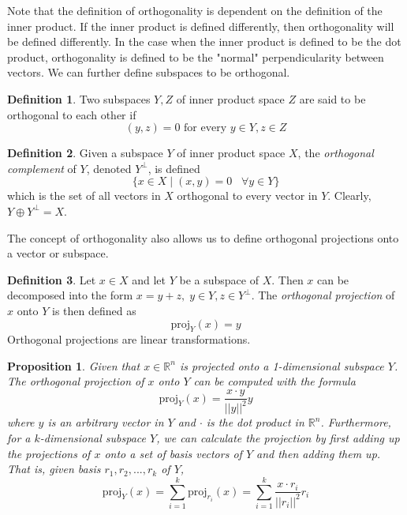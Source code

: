 \documentclass{article}
\newtheorem{proposition}[theorem]{Proposition}
\theoremstyle{remark}
\theoremstyle{definition}
\newtheorem{definition}{Definition}[section]
\begin{document}
Note that the definition of orthogonality is dependent on the definition of the inner product. If the inner product is defined differently, then orthogonality will be defined differently. In the case when the inner product is defined to be the dot product, orthogonality is defined to be the "normal" perpendicularity between vectors. We can further define subspaces to be orthogonal. 

\begin{definition}
Two subspaces $Y, Z$ of inner product space $Z$ are said to be orthogonal to each other if 
\[(y, z) = 0 \text{   for every } y \in Y, z \in Z\]
\end{definition}

\begin{definition}
Given a subspace $Y$ of inner product space $X$, the \textit{orthogonal complement} of $Y$, denoted $Y^\perp$, is defined
\[ \{ x \in X \; | \; (x, y) = 0 \;\;\; \forall y \in Y\}\]
which is the set of all vectors in $X$ orthogonal to every vector in $Y$. Clearly, $Y \oplus Y^\perp = X$. 
\end{definition}

The concept of orthogonality also allows us to define orthogonal projections onto a vector or subspace. 

\begin{definition}
Let $x \in X$ and let $Y$ be a subspace of $X$. Then $x$ can be decomposed into the form $x = y + z, \; y \in Y, z \in Y^\perp$. The \textit{orthogonal projection} of $x$ onto $Y$ is then defined as 
\[\text{proj}_Y (x) = y\]
Orthogonal projections are linear transformations. 
\end{definition}

\begin{proposition}
Given that $x \in \mathbb{R}^n$ is projected onto a 1-dimensional subspace $Y$. The orthogonal projection of $x$ onto $Y$ can be computed with the formula 
\[\text{proj}_Y (x) = \frac{x \cdot y}{||y||^2} y\]
where $y$ is an arbitrary vector in $Y$ and $\cdot$ is the dot product in $\mathbb{R}^n$. Furthermore, for a $k$-dimensional subspace $Y$, we can calculate the projection by first adding up the projections of $x$ onto a set of basis vectors of $Y$ and then adding them up. That is, given basis $r_1, r_2, ..., r_k$ of $Y$,
\begin{equation*}
    \text{proj}_Y (x) = \sum_{i=1}^k \text{proj}_{r_i} (x) = \sum_{i=1}^k \frac{x \cdot r_i}{||r_i||^2} r_i 
\end{equation*}
\end{proposition}
\end{document}
